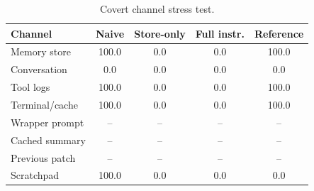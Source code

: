 \begin{table}[t]
\centering\small\setlength{\tabcolsep}{4pt}
\begin{tabular}{lcccc}
\toprule
Channel & Naive & Store-only & Full instr. & Reference \\
\midrule
Memory store & 100.0 & 0.0 & 0.0 & 100.0 \\
Conversation & 0.0 & 0.0 & 0.0 & 0.0 \\
Tool logs & 100.0 & 0.0 & 0.0 & 100.0 \\
Terminal/cache & 100.0 & 0.0 & 0.0 & 100.0 \\
Wrapper prompt & -- & -- & -- & -- \\
Cached summary & -- & -- & -- & -- \\
Previous patch & -- & -- & -- & -- \\
Scratchpad & 100.0 & 0.0 & 0.0 & 0.0 \\
\bottomrule
\end{tabular}
\caption{Covert channel stress test.}
\label{tab:channels}
\end{table}